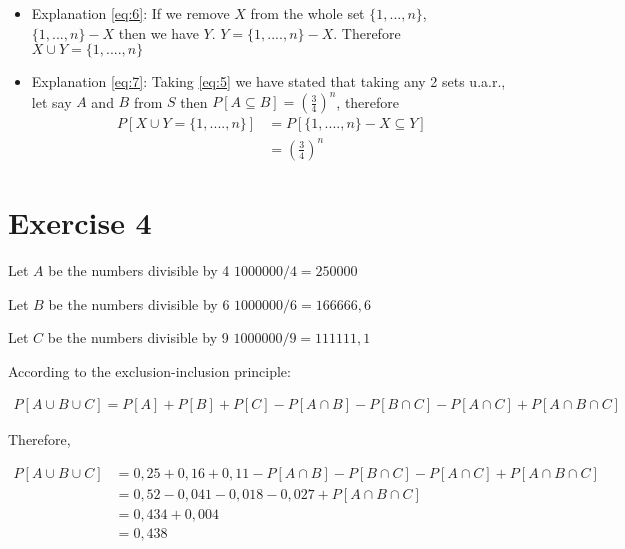\documentclass[12pt, a4paper]{article}
\begin{document}
\begin{itemize}
  \item Explanation \ref{eq:6}: If we remove $X$ from the whole set $\{1,...,n\}$,
    $\{1,...,n\} - X$ then we have $Y$. $Y = \{1,....,n\} - X$. Therefore $X \cup Y
    = \{1,....,n\}$
    \item Explanation \ref{eq:7}: Taking \ref{eq:5} we have stated that taking
      any 2 sets u.a.r., let say $A$ and $B$ from $S$ then $P[A \subseteq B] =
      \left( \frac{3}{4} \right)^n$, therefore
      \begin{equation}
        \begin{aligned}
          P[{X \cup Y} = \{1,....,n\}] &= P [ {\{1,....,n\} - X} \subseteq Y] \\
          &= \left( \frac{3}{4} \right)^n
        \end{aligned}
      \end{equation}
\end{itemize}

\section{Exercise 4}

Let $A$ be the numbers divisible by 4 $1000000/4 = 250000 $

Let $B$ be the numbers divisible by 6 $1000000/6 = 166666,6$

Let $C$ be the numbers divisible by 9 $1000000/9 = 111111,1$

According to the exclusion-inclusion principle:

\begin{equation}
  \begin{aligned}
    P[A \cup B \cup C] = P[A] + P[B] + P[C] - P[A \cap B] - P[B \cap C] - P[A \cap C] + P[A \cap B \cap C]
  \end{aligned}
\end{equation}

Therefore,

\begin{equation}
  \begin{aligned}
    P[A \cup B \cup C] &= 0,25 + 0,16 + 0,11 - P[A \cap B] - P[B \cap C] - P[A \cap C] + P[A \cap B \cap C] \\
    &= 0,52 - 0,041 - 0,018 - 0,027 + P [A \cap B \cap C] \\
    &= 0,434 + 0,004 \\
    &= 0,438 
  \end{aligned}
\end{equation}
\end{document}
